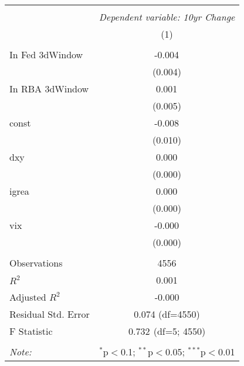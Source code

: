 \begin{table}[!htbp] \centering
\begin{tabular}{@{\extracolsep{5pt}}lc}
\\[-1.8ex]\hline
\hline \\[-1.8ex]
& \multicolumn{1}{c}{\textit{Dependent variable: 10yr Change}} \
\cr \cline{2-2}
\\[-1.8ex] & (1) \\
\hline \\[-1.8ex]
 In Fed 3dWindow & -0.004$^{}$ \\
& (0.004) \\
 In RBA 3dWindow & 0.001$^{}$ \\
& (0.005) \\
 const & -0.008$^{}$ \\
& (0.010) \\
 dxy & 0.000$^{}$ \\
& (0.000) \\
 igrea & 0.000$^{}$ \\
& (0.000) \\
 vix & -0.000$^{}$ \\
& (0.000) \\
\hline \\[-1.8ex]
 Observations & 4556 \\
 $R^2$ & 0.001 \\
 Adjusted $R^2$ & -0.000 \\
 Residual Std. Error & 0.074 (df=4550) \\
 F Statistic & 0.732$^{}$ (df=5; 4550) \\
\hline
\hline \\[-1.8ex]
\textit{Note:} & \multicolumn{1}{r}{$^{*}$p$<$0.1; $^{**}$p$<$0.05; $^{***}$p$<$0.01} \\
\end{tabular}
\end{table}